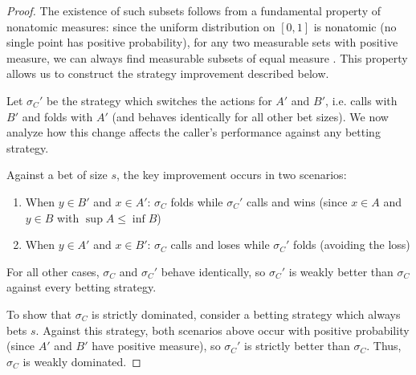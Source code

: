 \documentclass[../../main/main.tex]{subfiles}
\begin{document}
\begin{proof}
    The existence of such subsets follows from a fundamental property of nonatomic measures: since the uniform distribution on $[0,1]$ is nonatomic (no single point has positive probability), for any two measurable sets with positive measure, we can always find measurable subsets of equal measure \cite{Sierpinski1922}. This property allows us to construct the strategy improvement described below.

    Let $\sigma_C'$ be the strategy which switches the actions for $A'$ and $B'$, i.e. calls with $B'$ and folds with $A'$ (and behaves identically for all other bet sizes). We now analyze how this change affects the caller's performance against any betting strategy.

    Against a bet of size $s$, the key improvement occurs in two scenarios:
    \begin{enumerate}
        \item When $y \in B'$ and $x \in A'$: $\sigma_C$ folds while $\sigma_C'$ calls and wins (since $x \in A$ and $y \in B$ with $\sup A \leq \inf B$)
        \item When $y \in A'$ and $x \in B'$: $\sigma_C$ calls and loses while $\sigma_C'$ folds (avoiding the loss)
    \end{enumerate}

    For all other cases, $\sigma_C$ and $\sigma_C'$ behave identically, so $\sigma_C'$ is weakly better than $\sigma_C$ against every betting strategy.

    To show that $\sigma_C$ is strictly dominated, consider a betting strategy which always bets $s$. Against this strategy, both scenarios above occur with positive probability (since $A'$ and $B'$ have positive measure), so $\sigma_C'$ is strictly better than $\sigma_C$. Thus, $\sigma_C$ is weakly dominated.
\end{proof}



\end{document}
